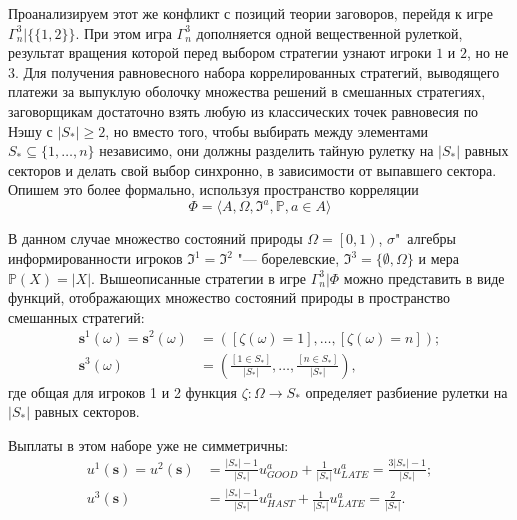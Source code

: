Проанализируем этот же конфликт с позиций теории заговоров, перейдя к игре $\Gamma^3_n | \{\{1,2\}\}$. При этом игра $\Gamma^3_n$ дополняется одной вещественной рулеткой, результат вращения которой перед выбором стратегии узнают игроки $1$ и $2$, но не $3$. Для получения равновесного набора коррелированных стратегий, выводящего платежи за выпуклую оболочку множества решений в смешанных стратегиях, заговорщикам достаточно взять любую из классических точек равновесия по Нэшу с $\left| S_* \right| \ge 2$, но вместо того, чтобы выбирать между элементами $S_* \subseteq \{1, \ldots, n\}$ независимо, они должны разделить тайную рулетку на $\left| S_* \right|$ равных секторов и делать свой выбор синхронно, в зависимости от выпавшего сектора. Опишем это более формально, используя пространство корреляции
\begin{equation*}
	\Phi = \langle A, \Omega, \mathfrak{I}^a, \mathbb{P}, a \in A \rangle
\end{equation*}

В данном случае множество состояний природы $\Omega = \left[0, 1\right)$, $\sigma$"~алгебры информированности игроков $\mathfrak{I}^1 = \mathfrak{I}^2$ "--- борелевские, $\mathfrak{I}^3 = \{\emptyset, \Omega\}$ и мера $\mathbb{P}(X) = \left| X \right|$. Вышеописанные стратегии в игре $\Gamma^3_n | \Phi$ можно представить в виде функций, отображающих множество состояний природы в пространство смешанных стратегий:
\begin{align*}
	\mathbf{s}^1(\omega) = \mathbf{s}^2(\omega) &= ([\zeta(\omega) = 1], \ldots, [\zeta(\omega) = n]); \\ \mathbf{s}^3(\omega) &= \left(\frac{[1 \in S_*]}{\left| S_* \right|}, \ldots, \frac{[n \in S_*]}{\left| S_* \right|}\right),
\end{align*}
где общая для игроков 1 и 2 функция $\zeta : \Omega \rightarrow S_*$ определяет разбиение рулетки на $\left| S_* \right|$ равных секторов.

Выплаты в этом наборе уже не симметричны:
\begin{align*}
	u^1(\mathbf{s}) = u^2(\mathbf{s}) &= \frac{\left| S_* \right| - 1}{\left| S_* \right|} u^a_{GOOD} + \frac{1}{\left| S_* \right|} u^a_{LATE} = \frac{3 \left| S_* \right| - 1}{\left| S_* \right|};\\
	u^3(\mathbf{s}) &= \frac{\left| S_* \right| - 1}{\left| S_* \right|} u^a_{HAST} + \frac{1}{\left| S_* \right|} u^a_{LATE} = \frac{2}{\left| S_* \right|}.
\end{align*}

